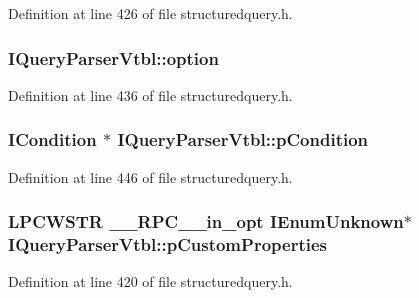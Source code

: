 Definition at line 426 of file structuredquery.\+h.

\subsubsection[{\texorpdfstring{option}{option}}]{ I\+Query\+Parser\+Vtbl\+::option}\hypertarget{struct_i_query_parser_vtbl_a26c0b82d3766c561e6deea530927206f}{}\label{struct_i_query_parser_vtbl_a26c0b82d3766c561e6deea530927206f}


Definition at line 436 of file structuredquery.\+h.

\subsubsection[{\texorpdfstring{p\+Condition}{pCondition}}]{ {\bf I\+Condition} $\ast$ I\+Query\+Parser\+Vtbl\+::p\+Condition}\hypertarget{struct_i_query_parser_vtbl_a3f27f539dc68169c04fd9bbe90f72be3}{}\label{struct_i_query_parser_vtbl_a3f27f539dc68169c04fd9bbe90f72be3}


Definition at line 446 of file structuredquery.\+h.

\subsubsection[{\texorpdfstring{p\+Custom\+Properties}{pCustomProperties}}]{ {\bf L\+P\+C\+W\+S\+TR} {\bf \+\_\+\+\_\+\+R\+P\+C\+\_\+\+\_\+in\+\_\+opt} I\+Enum\+Unknown$\ast$ I\+Query\+Parser\+Vtbl\+::p\+Custom\+Properties}\hypertarget{struct_i_query_parser_vtbl_a6cb966c92a08674b3184c6f97807c571}{}\label{struct_i_query_parser_vtbl_a6cb966c92a08674b3184c6f97807c571}


Definition at line 420 of file structuredquery.\+h.

